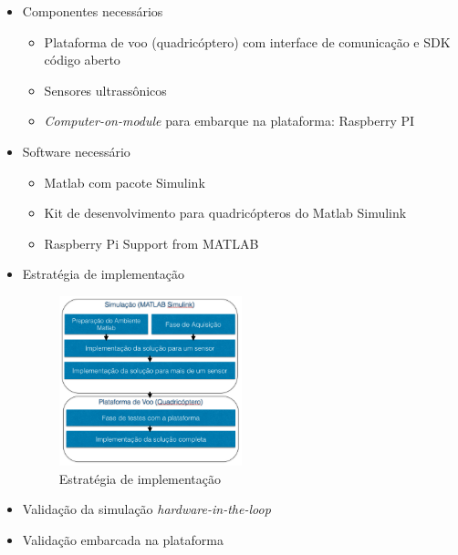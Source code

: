 \documentclass{beamer}
\begin{document}
\begin{frame}[allowframebreaks]
\begin{itemize}
		\item Componentes necessários
		\begin{itemize}	
			
			\item Plataforma de voo (quadricóptero) com interface de comunicação e SDK código aberto
			
			\item Sensores ultrassônicos
			
			\item \textit{Computer-on-module} para embarque na plataforma: Raspberry PI
				
		\end{itemize}
		
		\item Software necessário
		\begin{itemize}	
			
			\item Matlab com pacote Simulink
			
			\item Kit de desenvolvimento para quadricópteros do Matlab Simulink
			
			\item Raspberry Pi Support from MATLAB
			
		\end{itemize}
	
	\framebreak	
		
		\item Estratégia de implementação
		
		\begin{figure}[h]
			\centering
			\includegraphics[keepaspectratio = true,
			width=0.5\textwidth]{img/fluxo.png}
			\caption{Estratégia de implementação}
			\label{fig:Fluxo}
		\end{figure}
		
		\framebreak	
		
		\item Validação da simulação \textit{hardware-in-the-loop}
		
		\item Validação embarcada na plataforma
		
			
			
	\end{itemize}
	
		 
	
\end{frame}
\end{document}
